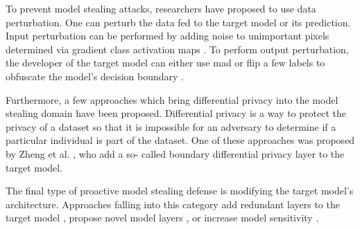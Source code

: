 To prevent model stealing attacks, researchers have proposed to use data perturbation. One can perturb the data fed to the target model or its prediction.
Input perturbation can be performed by adding noise to unimportant pixels determined via gradient class activation maps \cite{guiga2020neural}. To perform output perturbation,
the developer of the target model can either use \gls{mad} \cite{orekondy2019prediction} or flip a few labels to obfuscate the model's decision boundary
\cite{shi2017evasion}. \par
Furthermore, a few approaches which bring differential privacy into the model stealing domain have been proposed. Differential privacy is a way to protect the privacy of a dataset so that 
it is impossible for an adversary to determine if a particular individual is part of the dataset. One of these approaches was proposed by Zheng et al. \cite{zheng2019bdpl}, who add a so-
called boundary differential privacy layer to the target model. \par
The final type of proactive model stealing defense is modifying the target model's architecture. Approaches falling into this category add redundant layers to the target model 
\cite{chabanne2020protection}, propose novel model layers \cite{xu2018deepobfuscation}, or increase model sensitivity \cite{szentannai2020preventing}.